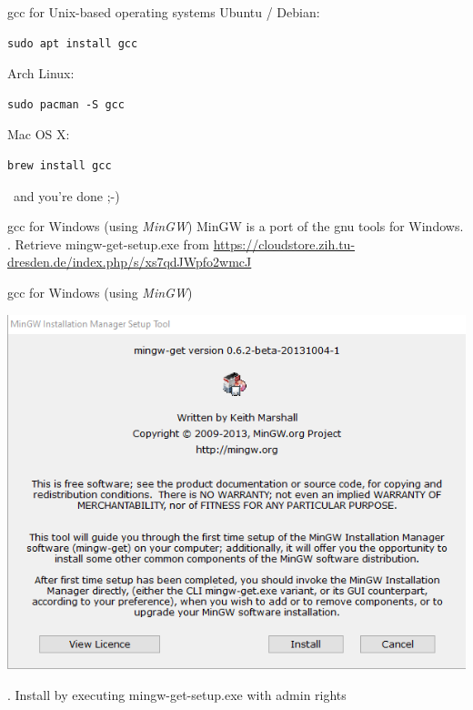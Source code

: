 \begin{frame}[fragile]{gcc for Unix-based operating systems}
	Ubuntu / Debian:
	\begin{lstlisting}[numbers=none]
sudo apt install gcc
\end{lstlisting}
	\bigskip
	Arch Linux:
	\begin{lstlisting}[numbers=none]
sudo pacman -S gcc
\end{lstlisting}
	\bigskip
	Mac OS X:
	\begin{lstlisting}[numbers=none]
brew install gcc
\end{lstlisting}
	\bigskip
	\textellipsis\ and you're done ;-)
\end{frame}

\begin{frame}{gcc for Windows (using \textit{MinGW})}
	MinGW is a port of the gnu tools for Windows.\\
	. Retrieve mingw-get-setup.exe from \url{https://cloudstore.zih.tu-dresden.de/index.php/s/xs7qdJWpfo2wmcJ}
\end{frame}

\begin{frame}{gcc for Windows (using \textit{MinGW})}
	\centerline{\includegraphics[scale=.45]{../img/install/mingw/setup.png}}
	. Install by executing mingw-get-setup.exe with admin rights
\end{frame}

